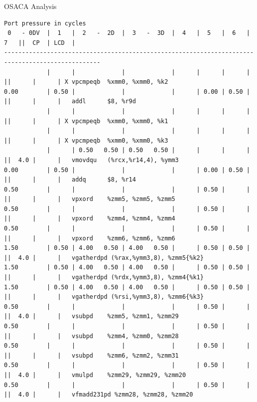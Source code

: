 \documentclass[aspectratio=169,t]{beamer}
\begin{document}
  \begin{frame}[fragile]{OSACA Analysis}
    \vspace{-20pt}
    \begin{lstlisting}[basicstyle=\tt\fontsize{4pt}{6pt}\selectfont]
                                     Port pressure in cycles
 0   - 0DV  |  1   |  2   -  2D  |  3   -  3D  |  4   |  5   |  6   |  7   ||  CP  | LCD  |
-------------------------------------------------------------------------------------------------
            |      |             |             |      |      |      |      ||      |      | X vpcmpeqb  %xmm0, %xmm0, %k2
0.00        | 0.50 |             |             |      | 0.00 | 0.50 |      ||      |      |   addl      $8, %r9d
            |      |             |             |      |      |      |      ||      |      | X vpcmpeqb  %xmm0, %xmm0, %k1
            |      |             |             |      |      |      |      ||      |      | X vpcmpeqb  %xmm0, %xmm0, %k3
            |      | 0.50   0.50 | 0.50   0.50 |      |      |      |      ||  4.0 |      |   vmovdqu   (%rcx,%r14,4), %ymm3
0.00        | 0.50 |             |             |      | 0.00 | 0.50 |      ||      |      |   addq      $8, %r14
0.50        |      |             |             |      | 0.50 |      |      ||      |      |   vpxord    %zmm5, %zmm5, %zmm5
0.50        |      |             |             |      | 0.50 |      |      ||      |      |   vpxord    %zmm4, %zmm4, %zmm4
0.50        |      |             |             |      | 0.50 |      |      ||      |      |   vpxord    %zmm6, %zmm6, %zmm6
1.50        | 0.50 | 4.00   0.50 | 4.00   0.50 |      | 0.50 | 0.50 |      ||  4.0 |      |   vgatherdpd (%rax,%ymm3,8), %zmm5{%k2}
1.50        | 0.50 | 4.00   0.50 | 4.00   0.50 |      | 0.50 | 0.50 |      ||      |      |   vgatherdpd (%rdx,%ymm3,8), %zmm4{%k1}
1.50        | 0.50 | 4.00   0.50 | 4.00   0.50 |      | 0.50 | 0.50 |      ||      |      |   vgatherdpd (%rsi,%ymm3,8), %zmm6{%k3}
0.50        |      |             |             |      | 0.50 |      |      ||  4.0 |      |   vsubpd    %zmm5, %zmm1, %zmm29
0.50        |      |             |             |      | 0.50 |      |      ||      |      |   vsubpd    %zmm4, %zmm0, %zmm28
0.50        |      |             |             |      | 0.50 |      |      ||      |      |   vsubpd    %zmm6, %zmm2, %zmm31
0.50        |      |             |             |      | 0.50 |      |      ||  4.0 |      |   vmulpd    %zmm29, %zmm29, %zmm20
0.50        |      |             |             |      | 0.50 |      |      ||  4.0 |      |   vfmadd231pd %zmm28, %zmm28, %zmm20

\end{lstlisting}
\end{frame}
\end{document}
